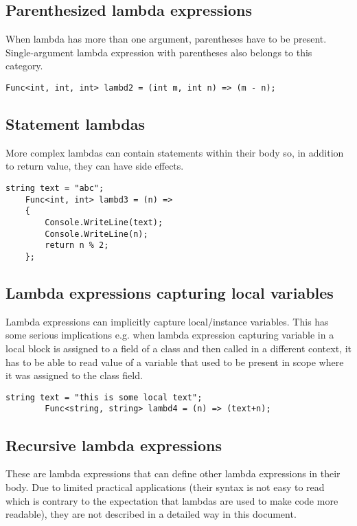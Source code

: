 \documentclass[]{report}
\begin{document}
    \subsection{Parenthesized lambda expressions}    
    When lambda has more than one argument, parentheses have to be present. Single-argument lambda expression with parentheses also belongs to this category.
    \begin{lstlisting}[style=sharpc, caption=Lambda arguments can have types defined explicitly]
    Func<int, int, int> lambd2 = (int m, int n) => (m - n);
    \end{lstlisting}
    
    \subsection{Statement lambdas}
    More complex lambdas can contain statements within their body so, in addition to return value, they can have side effects.
    \begin{lstlisting}[style=sharpc, caption=execution lambd3 has side-effects that have no impact on the returned value]
    string text = "abc";
    Func<int, int> lambd3 = (n) =>
    {
        Console.WriteLine(text);
        Console.WriteLine(n);
        return n % 2;
    };
    \end{lstlisting}
    
    \subsection{Lambda expressions capturing local variables}
        Lambda expressions can implicitly capture local/instance variables. This has some serious implications e.g. when lambda expression capturing variable in a local block is assigned to a field of a class and then called in a different context, it has to be able to read value of a variable that used to be present in scope where it was assigned to the class field.
        \begin{lstlisting}[style=sharpc, caption="lambd4 has access to the local variable text in any context that. This property is sometimes called closure"]        
        string text = "this is some local text";
        Func<string, string> lambd4 = (n) => (text+n);
        \end{lstlisting}
    
    \subsection{Recursive lambda expressions}
    These are lambda expressions that can define other lambda expressions in their body. Due to limited practical applications (their syntax is not easy to read which is contrary to the expectation that lambdas are used to make code more readable), they are not described in a detailed way in this document.
    
\end{document}
